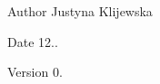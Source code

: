 \begin{DoxyAuthor}{Author}
Justyna Klijewska 
\end{DoxyAuthor}
\begin{DoxyDate}{Date}
12.. 
\end{DoxyDate}
\begin{DoxyVersion}{Version}
0. 
\end{DoxyVersion}
